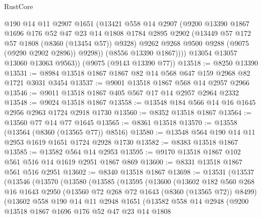 \begin{lexlean}{RustCore}
\begin{coremodule}
              @190
              @14
              @11
              @2907
              @1651
              (@13421
                @558
                @14
                @2907
                (@9200
                  @13390
                  @1867
                  @1696
                  @176
                  @52
                  @47
                  @23
                  @14
                  @1808
                  @1784
                  @2895
                  @2902
                  (@13449 @57 @172 @57 @1808 (@8360 (@13454 @57)) @9328)
                  @9262
                  @9268
                  @9500
                  @9288
                  (@9075 (@9290 @2902 @2896))
                  @9298))
              (@8556 @13390 @1867))))
        @13054
        @13057
        @13060
        @13063
        @9563))
    (@9075 (@9143 @13390 @77))
@13518 := @8250 @13390
@13531 := @8984 @13518 @1867 @1867 @82 @14 @568 @647 @159 @2968 @82 @1721 @3031 @3454
@13537 := @9001 @13518 @1867 @568 @14 @2957 @2966
@13546 := @9011 @13518 @1867 @405 @567 @17 @14 @2957 @2964 @2332
@13548 := @9024 @13518 @1867
@13558 := @13548 @184 @566 @14 @16 @1645 @2956 @2963 @1724 @2918 @1730
@13560 := @8352 @13518 @1867
@13564 := @13560 @77 @14 @77 @1645
@13565 := @8361 @13518
@13570 := @13558 (@13564 (@8360 (@13565 @77)) @8516)
@13580 := @13548 @564 @190 @14 @11 @2953 @1619 @1651 @1724 @2928 @1730
@13582 := @8383 @13518 @1867
@13585 := @13582 @564 @14 @2953
@13595 := @9170 @13518 @1867 @102 @561 @516 @14 @1619 @2951 @1867 @869
@13600 := @8331 @13518 @1867 @561 @516 @2951
@13602 := @8340 @13518 @1867
@13698 := @13531
    (@13537
      (@13546
        (@13570
          (@13580
            (@13585
              (@13595
                (@13600
                  (@13602
                    @182
                    @560
                    @268
                    @16
                    @1643
                    @2950
                    (@13560 @72 @268 @72 @1643 (@8360 (@13565 @72)) @8499)
                    (@13602
                      @558
                      @190
                      @14
                      @11
                      @2948
                      @1651
                      (@13582
                        @558
                        @14
                        @2948
                        (@9200
                          @13518
                          @1867
                          @1696
                          @176
                          @52
                          @47
                          @23
                          @14
                          @1808

\end{coremodule}
\end{lexlean}
